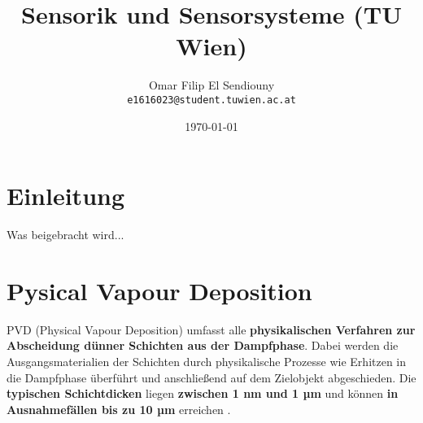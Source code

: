 \documentclass{article} %
\title{Sensorik und Sensorsysteme (TU Wien)}
\author{Omar Filip El Sendiouny \\ \texttt{e1616023@student.tuwien.ac.at}}
\date{\today}
\begin{document}
\maketitle
\thispagestyle{empty} %
\newpage  

\tableofcontents
\thispagestyle{empty}
\newpage


\section*{Einleitung} %
Was beigebracht wird...

\vspace{1em}
\section{Pysical Vapour Deposition} %
PVD (Physical Vapour Deposition) umfasst alle \textbf{physikalischen Verfahren zur Abscheidung dünner Schichten aus der Dampfphase}.
Dabei werden die Ausgangsmaterialien der Schichten durch physikalische Prozesse wie Erhitzen in die Dampfphase überführt und anschließend 
auf dem Zielobjekt abgeschieden. Die \textbf{typischen Schichtdicken} liegen \textbf{zwischen 1 nm und 1 µm} und können 
\textbf{in Ausnahmefällen bis zu 10 µm} erreichen \cite{keplinger2024}.

\vspace{1em}
\end{document}
